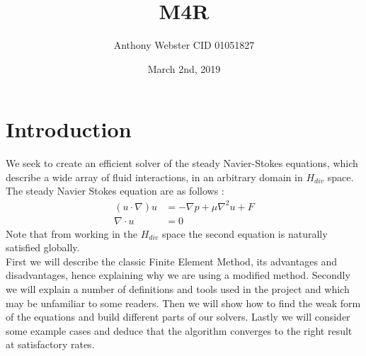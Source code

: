 \documentclass[11pt,twoside,a4paper]{article}
\begin{document}
\setcounter{secnumdepth}{4}
\title{M4R}
\date{March 2nd, 2019}
\author{Anthony Webster CID 01051827}
\maketitle
\section{Introduction}
We seek to create an efficient solver of the steady Navier-Stokes equations, which describe a wide array of fluid interactions, in an arbitrary domain in $H_{div}$ space. The steady Navier Stokes equation are as follows : 
\begin{align}
(u \cdot \nabla) u &= -\nabla p + \mu \nabla^2 u + F \\
\nabla \cdot u &= 0
\end{align}
Note that from working in the $H_{div}$ space the second equation is naturally satisfied globally.
\\
First we will describe the classic Finite Element Method, its advantages and disadvantages, hence explaining why we are using a modified method. Secondly we will explain a number of definitions and tools used in the project and which may be unfamiliar to some readers. Then we will show how to find the weak form of the equations and build different parts of our solvers. Lastly we will consider some example cases and deduce that the algorithm converges to the right result at satisfactory rates.\\
\end{document}
